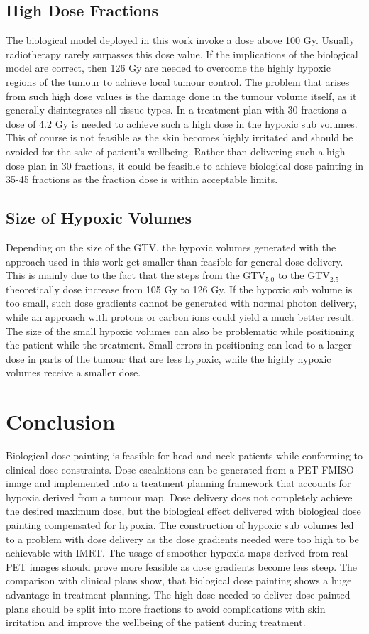 \subsection{High Dose Fractions}
The biological model deployed in this work invoke a dose above 100 Gy. Usually radiotherapy rarely surpasses this dose value. If the implications of the biological model are correct, then 126 Gy are needed to overcome the highly hypoxic regions of the tumour to achieve local tumour control. The problem that arises from such high dose values is the damage done in the tumour volume itself, as it generally disintegrates all tissue types. In a treatment plan with 30 fractions a dose of 4.2 Gy is needed to achieve such a high dose in the hypoxic sub volumes. This of course is not feasible as the skin becomes highly irritated and should be avoided for the sake of patient's wellbeing. Rather than delivering such a high dose plan in 30 fractions, it could be feasible to achieve biological dose painting in 35-45 fractions as the fraction dose is within acceptable limits.
\subsection{Size of Hypoxic Volumes}
Depending on the size of the GTV, the hypoxic volumes generated with the approach used in this work get smaller than feasible for general dose delivery. This is mainly due to the fact that the steps from the GTV$_{5.0}$ to the GTV$_{2.5}$ theoretically dose increase from 105 Gy to 126 Gy. If the hypoxic sub volume is too small, such dose gradients cannot be generated with normal photon delivery, while an approach with protons or carbon ions could yield a much better result. The size of the small hypoxic volumes can also be problematic while positioning the patient while the treatment. Small errors in positioning can lead to a larger dose in parts of the tumour that are less hypoxic, while the highly hypoxic volumes receive a smaller dose. 
\section{Conclusion}
Biological dose painting is feasible for head and neck patients while conforming to clinical dose constraints. Dose escalations can be generated from a PET FMISO image and implemented into a treatment planning framework that accounts for hypoxia derived from a tumour map. Dose delivery does not completely achieve the desired maximum dose, but the biological effect delivered with biological dose painting compensated for hypoxia. The construction of hypoxic sub volumes led to a problem with dose delivery as the dose gradients needed were too high to be achievable with IMRT. The usage of smoother hypoxia maps derived from real PET images should prove more feasible as dose gradients become less steep. The comparison with clinical plans show, that biological dose painting shows a huge advantage in treatment planning. The high dose needed to deliver dose painted plans should be split into more fractions to avoid complications with skin irritation and improve the wellbeing of the patient during treatment.